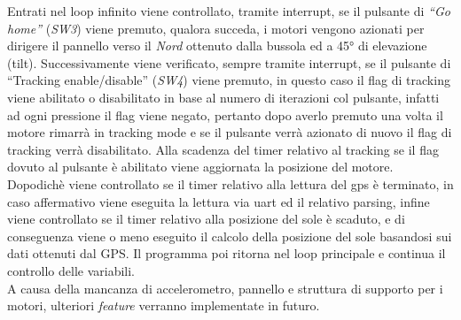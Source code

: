 \noindent Entrati nel loop infinito viene controllato, tramite interrupt, se il
pulsante di \emph{``Go home''} (\emph{SW3}) viene premuto, qualora
succeda, i motori vengono azionati per dirigere il pannello verso il
\emph{Nord} ottenuto dalla bussola ed a 45° di elevazione (tilt).
Successivamente viene verificato, sempre tramite interrupt, se il
pulsante di ``Tracking enable/disable'' (\emph{SW4}) viene premuto, in
questo caso il flag di tracking viene abilitato o disabilitato in base
al numero di iterazioni col pulsante, infatti ad ogni pressione il flag
viene negato, pertanto dopo averlo premuto una volta il motore rimarrà
in tracking mode e se il pulsante verrà azionato di nuovo il flag di
tracking verrà disabilitato. Alla scadenza del timer relativo al
tracking se il flag dovuto al pulsante è abilitato viene aggiornata la
posizione del motore. Dopodichè viene controllato se il timer relativo
alla lettura del gps è terminato, in caso affermativo viene eseguita la
lettura via uart ed il relativo parsing, infine viene controllato se il
timer relativo alla posizione del sole è scaduto, e di conseguenza viene
o meno eseguito il calcolo della posizione del sole basandosi sui dati
ottenuti dal GPS. Il programma poi ritorna nel loop principale e
continua il controllo delle variabili.\\
A causa della mancanza di accelerometro, pannello e struttura di
supporto per i motori, ulteriori \emph{feature} verranno implementate in
futuro.